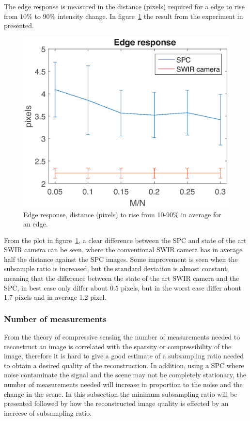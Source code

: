 The edge response is measured in the distance (pixels) required for a edge to rise from $10\%$ to $90\%$ intensity change. In figure~\ref{fig:rise} the result from the experiment in presented. 

\begin{figure}[H]
    \centering
    \includegraphics[width=0.7\linewidth]{result/mtf/Rise10_90.eps}
    \caption{Edge response, distance (pixels) to rise from 10-90\% in average for an edge.}
    \label{fig:rise}
\end{figure}

From the plot in figure~\ref{fig:rise}, a clear difference between the SPC and state of the art SWIR camera can be seen, where the conventional SWIR camera has in average half the distance against the SPC images. Some improvement is seen when the subsample ratio is increased, but the standard deviation is almost constant, meaning that the difference between the state of the art SWIR camera and the SPC, in best case only differ about 0.5 pixels, but in the worst case differ about 1.7 pixels and in average 1.2 pixel.

\subsubsection{Number of measurements}
\label{sec:measurements}
From the theory of compressive sensing the number of measurements needed to reconstruct an image is correlated with the sparsity or compressibility of the image, therefore it is hard to give a good estimate of a subsampling ratio needed to obtain a desired quality of the reconstruction. In addition, using a SPC where noise contaminate the signal and the scene may not be completely stationary, the number of measurements needed will increase in proportion to the noise and the change in the scene. In this subsection the minimum subsampling ratio will be presented followed by how the reconstructed image quality is effected by an increese of subsampling ratio.\\[0.1in]


